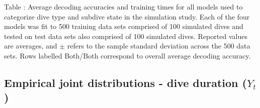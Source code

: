 \documentclass{article}
\begin{document}
        \noindent Table : Average decoding accuracies and training times for all models used to categorize dive type and subdive state in the simulation study. Each of the four models was fit to 500 training data sets comprised of 100 simulated dives and tested on test data sets also comprised of 100 simulated dives. Reported values are averages, and $\pm$ refers to the sample standard deviation across the 500 data sets. Rows labelled Both/Both correspond to overall average decoding accuracy.
        \addtocounter{tablenum}{1}

    \newpage
    \subsection{Empirical joint distributions - dive duration ($Y_t$)}
\end{document}
